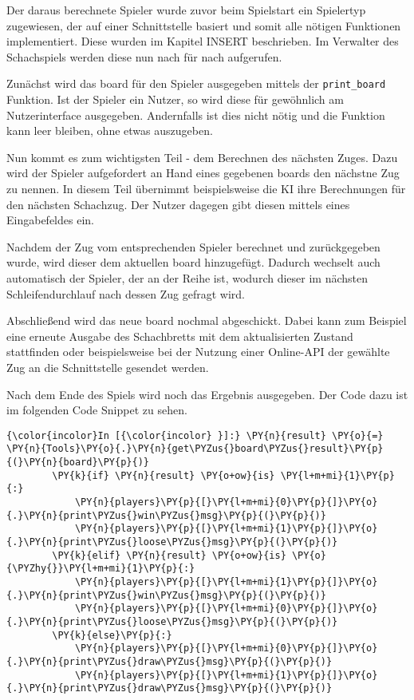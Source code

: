 Der daraus berechnete Spieler wurde zuvor beim Spielstart ein Spielertyp
zugewiesen, der auf einer Schnittstelle basiert und somit alle nötigen
Funktionen implementiert. Diese wurden im Kapitel INSERT beschrieben. Im
Verwalter des Schachspiels werden diese nun nach für nach aufgerufen.

Zunächst wird das board für den Spieler ausgegeben mittels der
\texttt{print\_board} Funktion. Ist der Spieler ein Nutzer, so wird
diese für gewöhnlich am Nutzerinterface ausgegeben. Andernfalls ist dies
nicht nötig und die Funktion kann leer bleiben, ohne etwas auszugeben.

Nun kommt es zum wichtigsten Teil - dem Berechnen des nächsten Zuges.
Dazu wird der Spieler aufgefordert an Hand eines gegebenen boards den
nächstne Zug zu nennen. In diesem Teil übernimmt beispielsweise die KI
ihre Berechnungen für den nächsten Schachzug. Der Nutzer dagegen gibt
diesen mittels eines Eingabefeldes ein.

Nachdem der Zug vom entsprechenden Spieler berechnet und zurückgegeben
wurde, wird dieser dem aktuellen board hinzugefügt. Dadurch wechselt
auch automatisch der Spieler, der an der Reihe ist, wodurch dieser im
nächsten Schleifendurchlauf nach dessen Zug gefragt wird.

Abschließend wird das neue board nochmal abgeschickt. Dabei kann zum
Beispiel eine erneute Ausgabe des Schachbretts mit dem aktualisierten
Zustand stattfinden oder beispielsweise bei der Nutzung einer Online-API
der gewählte Zug an die Schnittstelle gesendet werden.

Nach dem Ende des Spiels wird noch das Ergebnis ausgegeben. Der Code
dazu ist im folgenden Code Snippet zu sehen.

    \begin{Verbatim}[commandchars=\\\{\}]
{\color{incolor}In [{\color{incolor} }]:} \PY{n}{result} \PY{o}{=} \PY{n}{Tools}\PY{o}{.}\PY{n}{get\PYZus{}board\PYZus{}result}\PY{p}{(}\PY{n}{board}\PY{p}{)}
        \PY{k}{if} \PY{n}{result} \PY{o+ow}{is} \PY{l+m+mi}{1}\PY{p}{:}
            \PY{n}{players}\PY{p}{[}\PY{l+m+mi}{0}\PY{p}{]}\PY{o}{.}\PY{n}{print\PYZus{}win\PYZus{}msg}\PY{p}{(}\PY{p}{)}
            \PY{n}{players}\PY{p}{[}\PY{l+m+mi}{1}\PY{p}{]}\PY{o}{.}\PY{n}{print\PYZus{}loose\PYZus{}msg}\PY{p}{(}\PY{p}{)}
        \PY{k}{elif} \PY{n}{result} \PY{o+ow}{is} \PY{o}{\PYZhy{}}\PY{l+m+mi}{1}\PY{p}{:}
            \PY{n}{players}\PY{p}{[}\PY{l+m+mi}{1}\PY{p}{]}\PY{o}{.}\PY{n}{print\PYZus{}win\PYZus{}msg}\PY{p}{(}\PY{p}{)}
            \PY{n}{players}\PY{p}{[}\PY{l+m+mi}{0}\PY{p}{]}\PY{o}{.}\PY{n}{print\PYZus{}loose\PYZus{}msg}\PY{p}{(}\PY{p}{)}
        \PY{k}{else}\PY{p}{:}
            \PY{n}{players}\PY{p}{[}\PY{l+m+mi}{0}\PY{p}{]}\PY{o}{.}\PY{n}{print\PYZus{}draw\PYZus{}msg}\PY{p}{(}\PY{p}{)}
            \PY{n}{players}\PY{p}{[}\PY{l+m+mi}{1}\PY{p}{]}\PY{o}{.}\PY{n}{print\PYZus{}draw\PYZus{}msg}\PY{p}{(}\PY{p}{)}
\end{Verbatim}

